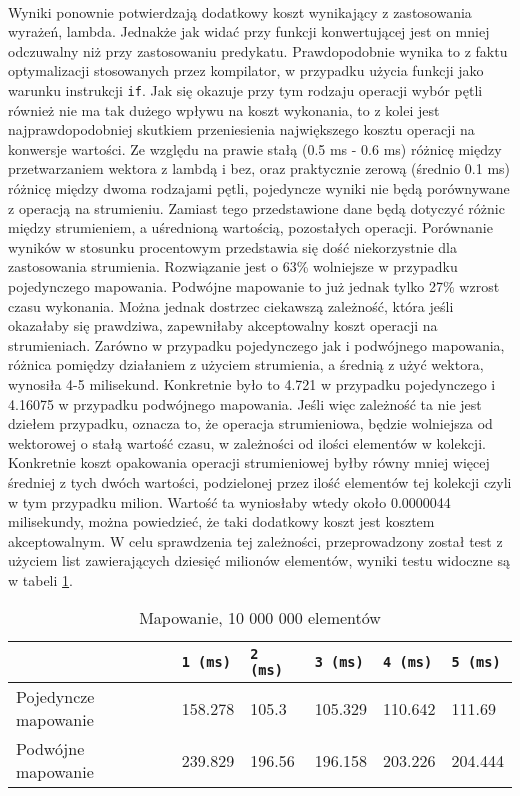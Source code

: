 \documentclass[a4paper,10pt]{report}
\begin{document}
\paragraph{}
Wyniki ponownie potwierdzają dodatkowy koszt wynikający z zastosowania wyrażeń, lambda. Jednakże jak widać przy funkcji konwertującej jest on mniej odczuwalny niż przy zastosowaniu predykatu. Prawdopodobnie wynika to z faktu optymalizacji stosowanych przez kompilator, w przypadku użycia funkcji jako warunku instrukcji \verb|if|. Jak się okazuje przy tym rodzaju operacji wybór pętli również nie ma tak dużego wpływu na koszt wykonania, to z kolei jest najprawdopodobniej skutkiem przeniesienia największego kosztu operacji na konwersje wartości. Ze względu na prawie stałą (0.5 ms - 0.6 ms) różnicę między przetwarzaniem wektora z lambdą i bez, oraz praktycznie zerową (średnio 0.1 ms) różnicę między dwoma rodzajami pętli, pojedyncze wyniki nie będą porównywane z operacją na strumieniu. Zamiast tego przedstawione dane będą dotyczyć różnic między strumieniem, a uśrednioną wartością, pozostałych operacji. Porównanie wyników w stosunku procentowym przedstawia się dość niekorzystnie dla zastosowania strumienia. Rozwiązanie jest o 63\% wolniejsze w przypadku pojedynczego mapowania. Podwójne mapowanie to już jednak tylko 27\% wzrost czasu wykonania. Można jednak dostrzec ciekawszą zależność, która jeśli okazałaby się prawdziwa, zapewniłaby akceptowalny koszt operacji na strumieniach. Zarówno w przypadku pojedynczego jak i podwójnego mapowania, różnica pomiędzy działaniem z użyciem strumienia, a średnią z użyć wektora, wynosiła 4-5 milisekund.
Konkretnie było to 4.721 w przypadku pojedynczego i 4.16075  w przypadku podwójnego mapowania. Jeśli więc zależność ta nie jest dziełem przypadku, oznacza to, że operacja strumieniowa, będzie wolniejsza od wektorowej o stałą wartość czasu, w zależności od ilości elementów w kolekcji. Konkretnie koszt opakowania operacji strumieniowej byłby równy mniej więcej średniej z tych dwóch wartości, podzielonej przez ilość elementów tej kolekcji czyli w tym przypadku milion. Wartość ta wyniosłaby wtedy około 0.0000044 milisekundy, można powiedzieć, że taki dodatkowy koszt jest kosztem akceptowalnym. W celu sprawdzenia tej zależności, przeprowadzony został test z użyciem list zawierających dziesięć milionów elementów, wyniki testu widoczne są w tabeli \ref{tab4}.
\begin{table}[t]
	\caption{Mapowanie, 10 000 000 elementów}
	\label{tab4}
	\begin{tabular}{|l|l|l|l|l|l|}
		\hline 
		& \verb|1 (ms)| & \verb|2 (ms)| & \verb|3 (ms)| & \verb|4 (ms)| & \verb|5 (ms)|\\
		\hline
		Pojedyncze mapowanie & 158.278 &		105.3 &		105.329 &		110.642 &		111.69 \\
		\hline
		Podwójne mapowanie & 239.829 &		196.56 &		196.158 &		203.226 &		204.444 \\
		\hline
	\end{tabular} 
\end{table}
\end{document}
